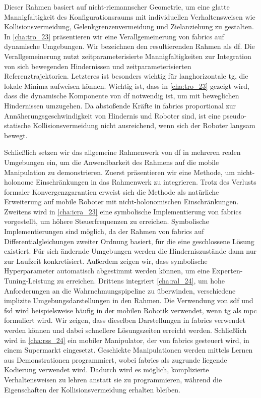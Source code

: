 Dieser Rahmen basiert auf nicht-riemannscher Geometrie, um eine glatte
Mannigfaltigkeit des Konfigurationsraums mit individuellen Verhaltensweisen wie
Kollisionsvermeidung, Gelenkgrenzenvermeidung und Zielanziehung zu gestalten. In
\cref{cha:tro_23} präsentieren wir eine Verallgemeinerung von \ac{fabrics} auf
dynamische Umgebungen. Wir bezeichnen den resultierenden Rahmen als \ac{df}. Die
Verallgemeinerung nutzt zeitparameterisierte Mannigfaltigkeiten zur Integration
von sich bewegenden Hindernissen und zeitparameterisierten Referenztrajektorien.
Letzteres ist besonders wichtig für langhorizontale \ac{tg}, die lokale Minima
aufweisen können. Wichtig ist, dass in \cref{cha:tro_23} gezeigt wird, dass die
dynamische Komponente von \ac{df} notwendig ist, um mit beweglichen Hindernissen
umzugehen. Da abstoßende Kräfte in \ac{fabrics} proportional zur
Annäherungsgeschwindigkeit von Hindernis und Roboter sind, ist eine
pseudo-statische Kollisionsvermeidung nicht ausreichend, wenn sich der Roboter
langsam bewegt.

Schließlich setzen wir das allgemeine Rahmenwerk von \ac{df} in mehreren realen
Umgebungen ein, um die Anwendbarkeit des Rahmens auf die mobile Manipulation zu
demonstrieren. Zuerst präsentieren wir eine Methode, um nicht-holonome
Einschränkungen in das Rahmenwerk zu integrieren. Trotz des Verlusts formaler
Konvergenzgarantien erweist sich die Methode als natürliche Erweiterung auf
mobile Roboter mit nicht-holonomischen Einschränkungen. Zweitens wird in
\cref{cha:icra_23} eine symbolische Implementierung von \ac{fabrics}
vorgestellt, um höhere Steuerfrequenzen zu erreichen. Symbolische
Implementierungen sind möglich, da der Rahmen von \ac{fabrics} auf
Differentialgleichungen zweiter Ordnung basiert, für die eine geschlossene
Lösung existiert. Für sich ändernde Umgebungen werden die Hinderniszustände dann
nur zur Laufzeit konkretisiert. Außerdem zeigen wir, dass symbolische
Hyperparameter automatisch abgestimmt werden können, um eine
Experten-Tuning-Leistung zu erreichen. Drittens integriert \cref{cha:ral_24}, um
hohe Anforderungen an die Wahrnehmungspipeline zu überwinden, verschiedene
implizite Umgebungsdarstellungen in den Rahmen. Die Verwendung von \acf{sdf} und
\acf{fsd} wird beispielsweise häufig in der mobilen Robotik verwendet, wenn
\ac{tg} als \ac{mpc} formuliert wird. Wir zeigen, dass dieselben Darstellungen
in \ac{fabrics} verwendet werden können und dabei schnellere Lösungszeiten
erreicht werden. Schließlich wird in \cref{cha:rss_24} ein mobiler Manipulator,
der von \ac{fabrics} gesteuert wird, in einem Supermarkt eingesetzt. Geschickte
Manipulationen werden mittels Lernen aus Demonstrationen programmiert, wobei
\ac{fabrics} als zugrunde liegende Kodierung verwendet wird. Dadurch wird es
möglich, komplizierte Verhaltensweisen zu lehren anstatt sie zu programmieren,
während die Eigenschaften der Kollisionsvermeidung erhalten bleiben.

